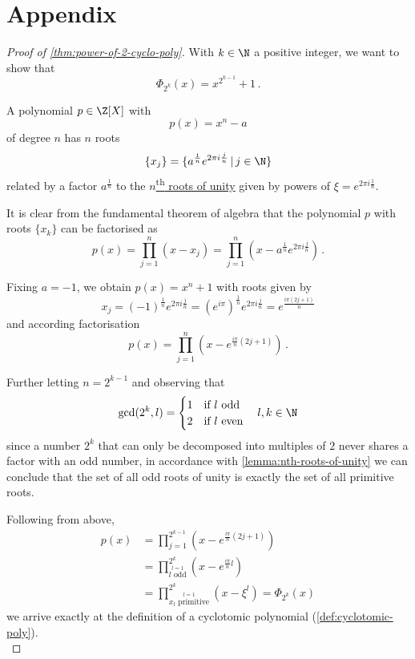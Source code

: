 \chapter*{Appendix}

\begin{proof}[Proof of \autoref{thm:power-of-2-cyclo-poly}]
  With $k \in \N$ a positive integer, we want to show that
  $$\Phi_{2^k} (x) = x^{2^{k-1}} + 1\,.$$

  A polynomial $p \in \Z[X]$ with $$p(x) = x^n - a$$ of degree $n$ has $n$ roots
  $$\{x_j\} = \{a^\frac{1}{n} e^{2\pi i \frac{j}{n}} \,|\, j \in \N\}$$
  related by a factor $a^\frac{1}{n}$ to the
  \hyperref[lemma:nth-roots-of-unity]{$n$\textsuperscript{th} roots of unity} given by powers of
  $\xi = e^{2\pi i \frac{1}{n}}$.

  It is clear from the fundamental theorem of algebra that the polynomial $p$ with roots $\{x_k\}$
  can be factorised as
  $$p(x) = \prod_{j=1}^{n} (x - x_j) = \prod_{j=1}^{n} (x - a^\frac{1}{n} e^{2\pi i \frac{j}{n}})\,.$$

  Fixing $a = -1$, we obtain $p(x) = x^n + 1$ with roots given by
  $$x_j = (-1)^\frac{1}{n} e^{2\pi i \frac{j}{n}}
    = (e^{i\pi})^\frac{1}{n} e^{2\pi i \frac{j}{n}}
    = e^{\frac{i\pi (2j + 1)}{n}}$$
  and according factorisation
  $$p(x) = \prod_{j=1}^{n} (x - e^{\frac{i\pi}{n} (2j + 1)})\,.$$

  Further letting $n = 2^{k-1}$ and observing that
  $$\gcd(2^k, l) = \begin{cases}
      1 & \text{if } l \text{ odd}  \\
      2 & \text{if } l \text{ even}
    \end{cases} \quad l, k \in \N$$
  since a number $2^k$ that can only be decomposed into multiples of $2$
  never shares a factor with an odd number, in accordance with \autoref{lemma:nth-roots-of-unity}
  we can conclude that the set of all odd roots of unity is exactly the set of all primitive roots.

  Following from above,
  \begin{align*}
    p(x) & = \prod_{j=1}^{2^{k-1}} (x - e^{\frac{i\pi}{n} (2j + 1)})                \\
         & = \prod_{\stackrel{l=1}{l \text{ odd}}}^{2^k} (x - e^{\frac{i\pi}{n} l}) \\
         & = \prod_{\stackrel{l=1}{x_l \text{ primitive}}}^{2^k} (x - \xi^l)
    = \Phi_{2^k}(x)
  \end{align*}
  we arrive exactly at the definition of a cyclotomic polynomial (\autoref{def:cyclotomic-poly}). \\
  \parencite{power-of-2-cyclo-poly}
\end{proof}
